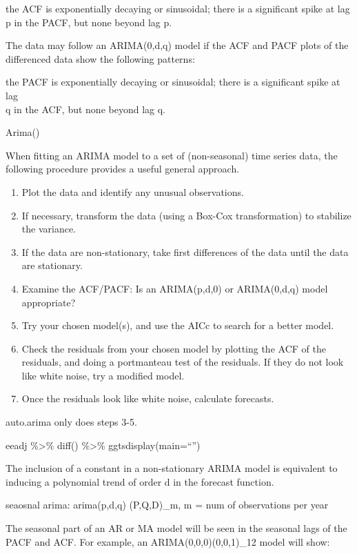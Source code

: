 \documentclass[]{book}
\begin{document}
the ACF is exponentially decaying or sinusoidal; there is a significant
spike at lag\\
p in the PACF, but none beyond lag p.

The data may follow an ARIMA(0,d,q) model if the ACF and PACF plots of
the differenced data show the following patterns:

the PACF is exponentially decaying or sinusoidal; there is a significant
spike at lag\\
q in the ACF, but none beyond lag q.

Arima()

When fitting an ARIMA model to a set of (non-seasonal) time series data,
the following procedure provides a useful general approach.

\begin{enumerate}
\def\labelenumi{\arabic{enumi}.}
\item
  Plot the data and identify any unusual observations.
\item
  If necessary, transform the data (using a Box-Cox transformation) to
  stabilize the variance.
\item
  If the data are non-stationary, take first differences of the data
  until the data are stationary.
\item
  Examine the ACF/PACF: Is an ARIMA(p,d,0) or ARIMA(0,d,q) model
  appropriate?
\item
  Try your chosen model(s), and use the AICc to search for a better
  model.
\item
  Check the residuals from your chosen model by plotting the ACF of the
  residuals, and doing a portmanteau test of the residuals. If they do
  not look like white noise, try a modified model.
\item
  Once the residuals look like white noise, calculate forecasts.
\end{enumerate}

auto.arima only does steps 3-5.

eeadj \%\textgreater{}\% diff() \%\textgreater{}\%
ggtsdisplay(main=``'')

The inclusion of a constant in a non-stationary ARIMA model is
equivalent to inducing a polynomial trend of order d in the forecast
function.

seaosnal arima: arima(p,d,q) (P,Q,D)\_m, m = num of observations per
year

The seasonal part of an AR or MA model will be seen in the seasonal lags
of the PACF and ACF. For example, an ARIMA(0,0,0)(0,0,1)\_12 model will
show:
\end{document}
